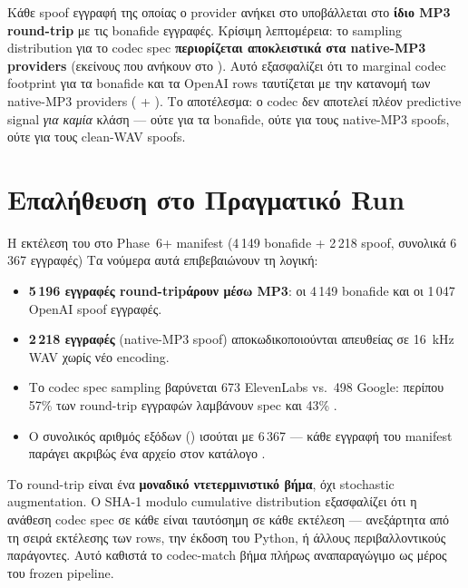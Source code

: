 Κάθε spoof εγγραφή της οποίας ο provider ανήκει στο
 υποβάλλεται στο \textbf{ίδιο MP3 round-trip}
με τις bonafide εγγραφές.
Κρίσιμη λεπτομέρεια: το sampling distribution για το codec spec
\textbf{περιορίζεται αποκλειστικά στα native-MP3 providers}
(εκείνους που ανήκουν στο ).
Αυτό εξασφαλίζει ότι το marginal codec footprint
για τα bonafide και τα OpenAI rows
ταυτίζεται με την κατανομή των native-MP3 providers
( + ).
Το αποτέλεσμα: ο codec δεν αποτελεί πλέον predictive signal
\emph{για καμία} κλάση — ούτε για τα bonafide,
ούτε για τους native-MP3 spoofs,
ούτε για τους clean-WAV spoofs.

\section{Επαλήθευση στο Πραγματικό Run}
\label{sec:codec-verification}

Η εκτέλεση του  στο Phase~6+ manifest
(4\,149 bonafide + 2\,218 spoof, συνολικά 6\,367 εγγραφές)
Τα νούμερα αυτά επιβεβαιώνουν τη λογική:

\begin{itemize}
  \item \textbf{5\,196 εγγραφές round-tripάρουν μέσω MP3}:
        οι 4\,149 bonafide και οι 1\,047 OpenAI spoof εγγραφές.
  \item \textbf{2\,218 εγγραφές} (native-MP3 spoof)
        αποκωδικοποιούνται απευθείας σε 16~kHz WAV χωρίς νέο encoding.
  \item Το codec spec sampling βαρύνεται
        673 ElevenLabs vs.\ 498 Google:
        περίπου 57\% των round-trip εγγραφών
        λαμβάνουν spec 
        και 43\% .
  \item Ο συνολικός αριθμός εξόδων ()
        ισούται με 6\,367 — κάθε εγγραφή του manifest
        παράγει ακριβώς ένα  αρχείο
        στον κατάλογο .
\end{itemize}

Το round-trip είναι ένα \textbf{μοναδικό ντετερμινιστικό βήμα},
όχι stochastic augmentation.
Ο SHA-1 modulo cumulative distribution εξασφαλίζει
ότι η ανάθεση codec spec σε κάθε 
είναι ταυτόσημη σε κάθε εκτέλεση —
ανεξάρτητα από τη σειρά εκτέλεσης των rows,
την έκδοση του Python, ή άλλους περιβαλλοντικούς παράγοντες.
Αυτό καθιστά το codec-match βήμα
πλήρως αναπαραγώγιμο ως μέρος του frozen pipeline.
